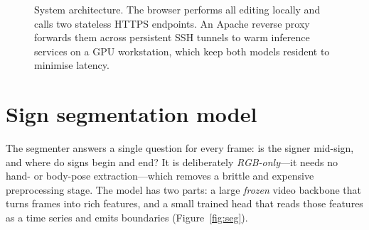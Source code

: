 \documentclass[11pt]{article}
\newcommand{\sub}{\normalfont\scriptsize\color{gray!55!black}}
\begin{document}
\begin{figure}[t]
\centering
{}
\caption{System architecture. The browser performs all editing locally and calls two stateless HTTPS
endpoints. An Apache reverse proxy forwards them across persistent SSH tunnels to warm inference
services on a GPU workstation, which keep both models resident to minimise latency.}
\label{fig:arch}
\end{figure}

\section{Sign segmentation model}\label{sec:seg}
The segmenter answers a single question for every frame: is the signer mid-sign, and where do signs
begin and end? It is deliberately \emph{RGB-only}---it needs no hand- or body-pose extraction---which
removes a brittle and expensive preprocessing stage. The model has two parts: a large \emph{frozen}
video backbone that turns frames into rich features, and a small trained head that reads those
features as a time series and emits boundaries (Figure~\ref{fig:seg}).
\end{document}
